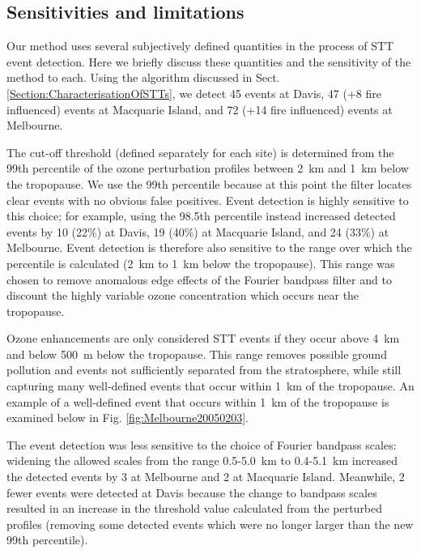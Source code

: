   \subsection{Sensitivities and limitations}
  \label{sec:sensitivity}
    Our method uses several subjectively defined quantities in the process of STT event detection.
    Here we briefly discuss these quantities and the sensitivity of the method to each.
    Using the algorithm discussed in Sect. \ref{Section:CharacterisationOfSTTs}, we detect 45 events at Davis, 47 (+8 fire influenced) events at Macquarie Island, and 72 (+14 fire influenced) events at Melbourne.
    
    The cut-off threshold (defined separately for each site) is determined from the 99th percentile of the ozone perturbation profiles between 2~km and 1~km below the tropopause.
    We use the 99th percentile because at this point the filter locates clear events with no obvious false positives.
    Event detection is highly sensitive to this choice; for example, using the 98.5th percentile instead increased detected events by 10 (22\%) at Davis, 19 (40\%) at Macquarie Island, and 24 (33\%) at Melbourne.
    Event detection is therefore also sensitive to the range over which the percentile is calculated (2~km to 1~km below the tropopause).
    This range was chosen to remove anomalous edge effects of the Fourier bandpass filter and to discount the highly variable ozone concentration which occurs near the tropopause.
    
    Ozone enhancements are only considered STT events if they occur above 4~km and below 500~m below the tropopause.
    This range removes possible ground pollution and events not sufficiently separated from the stratosphere, while still capturing many well-defined events that occur within 1~km of the tropopause.
    An example of a well-defined event that occurs within 1~km of the tropopause is examined below in Fig. \ref{fig:Melbourne20050203}.
    
    The event detection was less sensitive to the choice of Fourier bandpass scales: widening the allowed scales from the range 0.5-5.0~km to 0.4-5.1~km increased the detected events by 3 at Melbourne and 2 at Macquarie Island. Meanwhile, 2 fewer events were detected at Davis because the change to bandpass scales resulted in an increase in the threshold value calculated from the perturbed profiles (removing some detected events which were no longer larger than the new 99th percentile).
    
